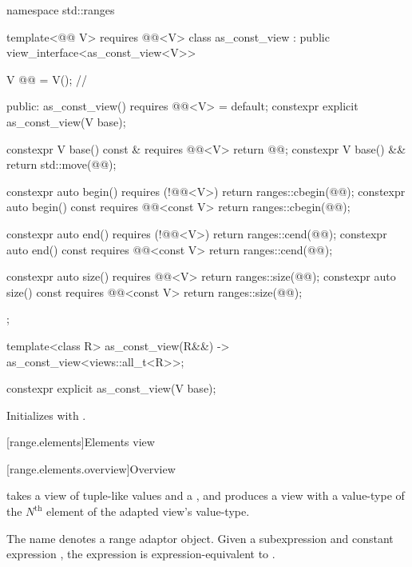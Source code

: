 \begin{codeblock}
namespace std::ranges {
  template<@@ V>
    requires @@<V>
  class as_const_view : public view_interface<as_const_view<V>> {
    V @@ = V();      // \expos

  public:
    as_const_view() requires @@<V> = default;
    constexpr explicit as_const_view(V base);

    constexpr V base() const & requires @@<V> { return @@; }
    constexpr V base() && { return std::move(@@); }

    constexpr auto begin() requires (!@@<V>) { return ranges::cbegin(@@); }
    constexpr auto begin() const requires @@<const V> { return ranges::cbegin(@@); }

    constexpr auto end() requires (!@@<V>) { return ranges::cend(@@); }
    constexpr auto end() const requires @@<const V> { return ranges::cend(@@); }

    constexpr auto size() requires @@<V> { return ranges::size(@@); }
    constexpr auto size() const requires @@<const V> { return ranges::size(@@); }
  };

  template<class R>
    as_const_view(R&&) -> as_const_view<views::all_t<R>>;
}
\end{codeblock}

\begin{itemdecl}
constexpr explicit as_const_view(V base);
\end{itemdecl}

\begin{itemdescr}
\pnum
\effects
Initializes  with .
\end{itemdescr}

[range.elements]{Elements view}

[range.elements.overview]{Overview}

\pnum
{} takes
a view of tuple-like values and a , and
produces a view with a value-type of the $N^\text{th}$ element
of the adapted view's value-type.

\pnum
{}%
The name  denotes
a range adaptor object.
Given a subexpression  and constant expression ,
the expression  is expression-equivalent to
.

